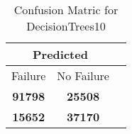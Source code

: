\begin{table}[] 
\caption{Confusion Matric for DecisionTrees10} 
\label{Table: Prediction Accuracy-DMDDecisionTrees10OnlySunEKF-combinationReflection-Reflection} 
\centering 
\begin{tabular} 
 {@{}ccc@{}} 
\toprule 
\multicolumn{2}{c}{\textbf{Predicted}}
 \\ \midrule 
\multicolumn{1}{|c|}{Failure} & 
\multicolumn{1}{c|}{No Failure}
 \\ \midrule 
\multicolumn{1}{|c|}{\color{green}\textbf{91798}} & 
\multicolumn{1}{c|}{\color{red}\textbf{25508}}
 \\ \midrule 
\multicolumn{1}{|c|}{\color{red}\textbf{15652}} & 
\multicolumn{1}{c|}{\color{green}\textbf{37170}}
 \\ \bottomrule 
\end{tabular} 
\end{table} 
